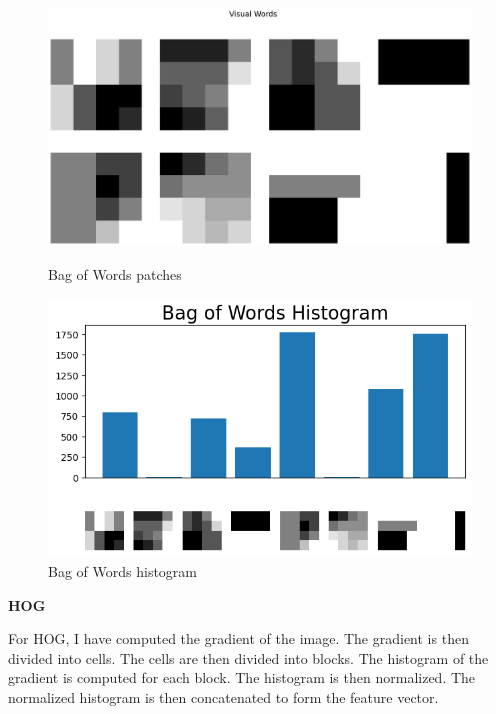 \begin{figure}[H]
    \centering
    \includegraphics[width=1\textwidth]{res/bow_patches.png}
    \caption{Bag of Words patches}
    \includegraphics[width=1\textwidth]{res/bow_hist.png}
    \caption{Bag of Words histogram}
    \label{fig:1.3}
\end{figure}


\newpage

\textbf{HOG}

For HOG, I have computed the gradient of the image. The gradient is then divided into cells. The cells are then divided into blocks. The histogram of the gradient is computed for each block. The histogram is then normalized. The normalized histogram is then concatenated to form the feature vector.

